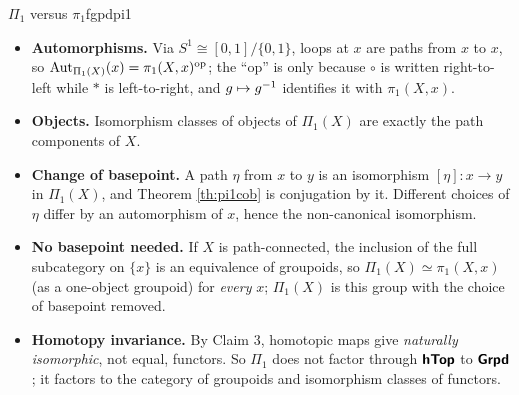 \begin{remark}{$\Pi_1$ versus $\pi_1$}{fgpdpi1}
  \begin{itemize}
    \item \textbf{Automorphisms.} Via $S^1\cong[0,1]/\{0,1\}$, loops at $x$ are paths from $x$ to $x$, so $\operatorname{Aut}_{\Pi_1(X)}(x)=\pi_1(X,x)^{\mathrm{op}}$; the ``op'' is only because $\circ$ is written right-to-left while $\ast$ is left-to-right, and $g\mapsto g^{-1}$ identifies it with $\pi_1(X,x)$.
    \item \textbf{Objects.} Isomorphism classes of objects of $\Pi_1(X)$ are exactly the path components of $X$.
    \item \textbf{Change of basepoint.} A path $\eta$ from $x$ to $y$ is an isomorphism $[\eta]:x\to y$ in $\Pi_1(X)$, and Theorem \ref{th:pi1cob} is conjugation by it. Different choices of $\eta$ differ by an automorphism of $x$, hence the non-canonical isomorphism.
    \item \textbf{No basepoint needed.} If $X$ is path-connected, the inclusion of the full subcategory on $\{x\}$ is an equivalence of groupoids, so $\Pi_1(X)\simeq\pi_1(X,x)$ (as a one-object groupoid) for \emph{every} $x$; $\Pi_1(X)$ is this group with the choice of basepoint removed.
    \item \textbf{Homotopy invariance.} By Claim 3, homotopic maps give \emph{naturally isomorphic}, not equal, functors. So $\Pi_1$ does not factor through $\bm{\mathsf{hTop}}$ to $\bm{\mathsf{Grpd}}$; it factors to the category of groupoids and isomorphism classes of functors.
  \end{itemize}
\end{remark}

